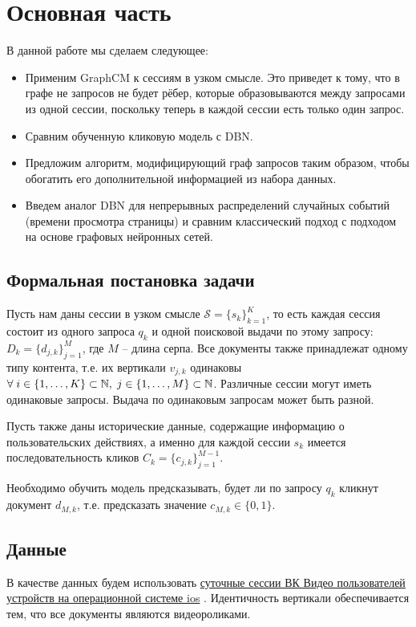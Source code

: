 \documentclass[diploma]{nanolab2015}
\begin{document}
\chapter{Основная часть}
В данной работе мы сделаем следующее:
\begin{itemize}
    \item Применим GraphCM к сессиям в узком смысле. Это приведет к тому, что в графе не запросов не будет рёбер, которые образовываются между запросами из одной сессии, поскольку теперь в каждой сессии есть только один запрос.
    \item Сравним обученную кликовую модель с DBN.
    \item Предложим алгоритм, модифицирующий граф запросов таким образом, чтобы обогатить его дополнительной информацией из набора данных.
    \item Введем аналог DBN для непрерывных распределений случайных событий (времени просмотра страницы) и сравним классический подход с подходом на основе графовых нейронных сетей.
\end{itemize}
\section{Формальная постановка задачи}
Пусть нам даны сессии в узком смысле $\mathcal{S} = \{s_k\}_{k=1}^K$, то есть каждая сессия состоит из одного запроса $q_k$ и одной поисковой выдачи по этому запросу: $D_k = \{d_{j, k}\}_{j=1}^M$, где $M$ -- длина серпа. Все документы также принадлежат одному типу контента, т.е. их вертикали $v_{j, k}$ одинаковы $\forall \; \space i \in \{1, \dots, K\} \subset \mathbb{N}, \; j \in \{1, \dots, M\} \subset \mathbb{N}$. Различные сессии могут иметь одинаковые запросы. Выдача по одинаковым запросам может быть разной.

Пусть также даны исторические данные, содержащие информацию о пользовательских действиях, а именно для каждой сессии $s_k$ имеется последовательность кликов $C_k = \{c_{j,k}\}_{j=1}^{M-1}$.

Необходимо обучить модель предсказывать, будет ли по запросу $q_k$ кликнут документ $d_{M, k}$, т.е. предсказать значение $c_{M, k} \in \{0, 1\}$.

\section{Данные}
В качестве данных будем использовать \href{https://github.com/agcr/vk-msu-ir-course-spring-2024/blob/055b4329ad60466c238044d3d1d16d2b9c9764d9/seminars/6-behaviour-ranking/iphone-20240201.tsv.gz}{суточные сессии ВК Видео пользователей устройств на операционной системе ios} \cite{vkds}. Идентичность вертикали обеспечивается тем, что все документы являются видеороликами.
\end{document}
